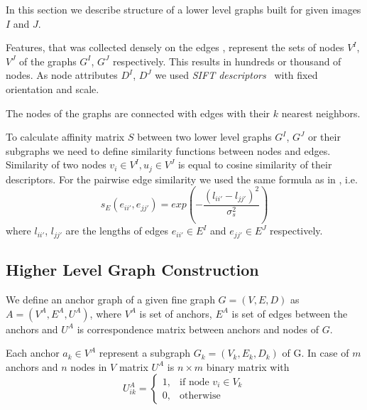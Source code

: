 \documentclass[
	fontsize=12pt,
	paper=a4,
	twoside=false,
	numbers=noenddot,
	plainheadsepline,
	toc=listof,
	toc=bibliography
]{scrartcl}
\begin{document}
In this section we describe structure of a lower level graphs built for given images $I$ and $J$.

Features, that was collected densely on the edges \cite{PMT}, represent the sets of nodes $V^I$, $V^J$ of the graphs $G^I$, $G^J$ respectively. This results in hundreds or thousand of nodes. As node attributes $D^I$, $D^J$ we used \emph{SIFT descriptors}~\cite{Lowe2004} with fixed orientation and scale. 

The nodes of the graphs are connected with edges with their $k$ nearest neighbors.

To calculate affinity matrix $S$ between two lower level graphs  $G^I$, $G^J$ or their subgraphs we need to define similarity functions between nodes and edges. Similarity of two nodes $v_i\in V^I, u_j\in V^J$ is equal to cosine similarity of their descriptors.
For the pairwise edge similarity we used the same formula as in \cite{Cho2014_Haystack, Suh_CVPR2015}, i.e.\ 
\begin{equation}
s_E(e_{ii\prime}, e_{jj\prime}) = exp(-\frac{(l_{ii\prime} - l_{jj\prime})^2}{\sigma^2_{s}})
\label{eq:s_e}
\end{equation}
where $l_{ii\prime}$, $l_{jj\prime} $ are the lengths of edges $e_{ii\prime}\in E^I$ and $e_{jj\prime}\in E^J$ respectively.




\subsection{Higher Level Graph Construction}


We define an anchor graph of a given fine graph $G = (V,E,D)$ as $A = (V^A,E^A, U^A)$, where $V^A$ is set of anchors, $E^{A}$ is set of edges between the anchors and $U^{A}$ is correspondence matrix between anchors and nodes of $G$.

Each anchor $a_k\in V^A$ represent a subgraph $G_k = (V_k,E_k, D_k)$ of G. In case of $m$ anchors and $n$ nodes in $V$  matrix $U^{A}$ is $n\times m$ binary matrix with 
$$U^{A}_{ik} = \begin{cases} 1, & \mbox{if node } v_i\in V_k    \\
	                         0, & \mbox{otherwise} \end{cases} $$	 
	                                                 
\end{document}
